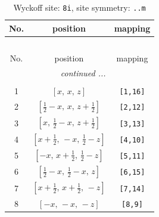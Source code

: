 \documentclass[fleqn,8pt]{jsarticle}
\begin{document}
\begin{longtable}{ccc}
\caption{Wyckoff site: {\tt 8i}, site symmetry: {\tt ..m}}
 \\
 \hline \hline
No. & position & mapping \\ \hline \endfirsthead

\multicolumn{2}{l}{\tablename\ \thetable{}} \\
 \hline \hline
No. & position & mapping \\ \hline \endhead

 \hline \hline
\multicolumn{2}{r}{\footnotesize\it continued ...} \\ \endfoot

 \hline \hline
\multicolumn{2}{r}{} \\ \endlastfoot

1 & $\left[ x,\, x,\, z \right]$ & {\tt [1,16]} \\ \hline
2 & $\left[ \frac{1}{2} - x,\, x,\, z + \frac{1}{2} \right]$ & {\tt [2,12]} \\ \hline
3 & $\left[ x,\, \frac{1}{2} - x,\, z + \frac{1}{2} \right]$ & {\tt [3,13]} \\ \hline
4 & $\left[ x + \frac{1}{2},\, - x,\, \frac{1}{2} - z \right]$ & {\tt [4,10]} \\ \hline
5 & $\left[ - x,\, x + \frac{1}{2},\, \frac{1}{2} - z \right]$ & {\tt [5,11]} \\ \hline
6 & $\left[ \frac{1}{2} - x,\, \frac{1}{2} - x,\, z \right]$ & {\tt [6,15]} \\ \hline
7 & $\left[ x + \frac{1}{2},\, x + \frac{1}{2},\, - z \right]$ & {\tt [7,14]} \\ \hline
8 & $\left[ - x,\, - x,\, - z \right]$ & {\tt [8,9]} \\
\end{longtable}
\renewcommand{\arraystretch}{1.2}
\end{document}
